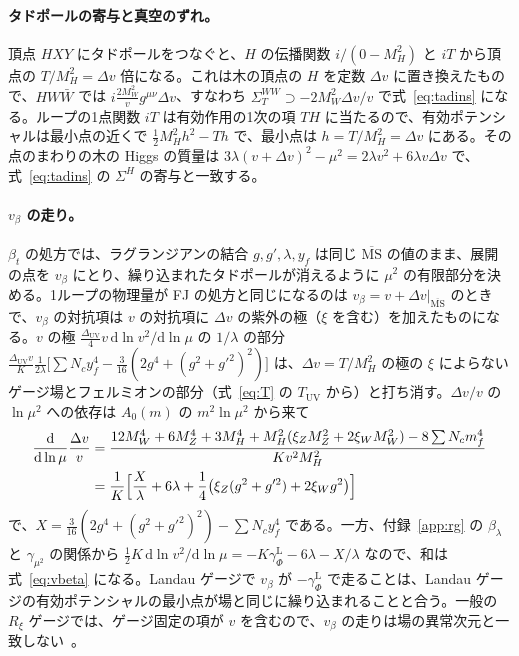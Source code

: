 \documentclass[a4paper,10pt]{ltjsarticle}
\newcommand{\dd}{\mathrm{d}}
\newcommand{\MSbar}{\overline{\mathrm{MS}}}
\newcommand{\DUV}{\Delta_{\mathrm{UV}}}
\begin{document}
\paragraph{タドポールの寄与と真空のずれ。}頂点 $HXY$ にタドポールをつなぐと、$H$ の伝播関数 $i/(0-M_H^2)$ と $iT$ から頂点の $T/M_H^2=\Delta v$ 倍になる。これは木の頂点の $H$ を定数 $\Delta v$ に置き換えたもので、$HW\bar W$ では $i\frac{2M_W^2}vg^{\mu\nu}\Delta v$、すなわち $\Sigma^{WW}_T\supset-2M_W^2\Delta v/v$ で式~\eqref{eq:tadins} になる。ループの1点関数 $iT$ は有効作用の1次の項 $TH$ に当たるので、有効ポテンシャルは最小点の近くで $\frac12M_H^2h^2-Th$ で、最小点は $h=T/M_H^2=\Delta v$ にある。その点のまわりの木の Higgs の質量は $3\lambda(v+\Delta v)^2-\mu^2=2\lambda v^2+6\lambda v\Delta v$ で、式~\eqref{eq:tadins} の $\Sigma^H$ の寄与と一致する。

\paragraph{$v_\beta$ の走り。}$\beta_t$ の処方では、ラグランジアンの結合 $g,g',\lambda,y_f$ は同じ $\MSbar$ の値のまま、展開の点を $v_\beta$ にとり、繰り込まれたタドポールが消えるように $\mu^2$ の有限部分を決める。1ループの物理量が FJ の処方と同じになるのは $v_\beta=v+\Delta v|_{\MSbar}$ のときで、$v_\beta$ の対抗項は $v$ の対抗項に $\Delta v$ の紫外の極（$\xi$ を含む）を加えたものになる。$v$ の極 $\frac{\DUV}4v\,\dd\ln v^2/\dd\ln\mu$ の $1/\lambda$ の部分 $\frac{\DUV v}{K}\frac1{2\lambda}\bigl[\sum N_cy_f^4-\frac3{16}(2g^4+(g^2+g'^2)^2)\bigr]$ は、$\Delta v=T/M_H^2$ の極の $\xi$ によらないゲージ場とフェルミオンの部分（式~\eqref{eq:T} の $T_{\mathrm{UV}}$ から）と打ち消す。$\Delta v/v$ の $\ln\mu^2$ への依存は $A_0(m)$ の $m^2\ln\mu^2$ から来て
\begin{equation*}
\begin{aligned}
\frac{\dd}{\dd\ln\mu}\frac{\Delta v}v&=\frac{12M_W^4+6M_Z^4+3M_H^4+M_H^2(\xi_ZM_Z^2+2\xi_WM_W^2)-8\sum N_cm_f^4}{Kv^2M_H^2}\\
&=\frac1K\Bigl[\frac{X}\lambda+6\lambda+\frac14\bigl(\xi_Z(g^2+g'^2)+2\xi_Wg^2\bigr)\Bigr]
\end{aligned}
\end{equation*}
で、$X=\frac3{16}(2g^4+(g^2+g'^2)^2)-\sum N_cy_f^4$ である。一方、付録~\ref{app:rg} の $\beta_\lambda$ と $\gamma_{\mu^2}$ の関係から $\frac12K\,\dd\ln v^2/\dd\ln\mu=-K\gamma_\Phi^{\mathrm L}-6\lambda-X/\lambda$ なので、和は式~\eqref{eq:vbeta} になる。Landau ゲージで $v_\beta$ が $-\gamma_\Phi^{\mathrm L}$ で走ることは、Landau ゲージの有効ポテンシャルの最小点が場と同じに繰り込まれることと合う。一般の $R_\xi$ ゲージでは、ゲージ固定の項が $v$ を含むので、$v_\beta$ の走りは場の異常次元と一致しない~\cite{ssv13}。
\end{document}
